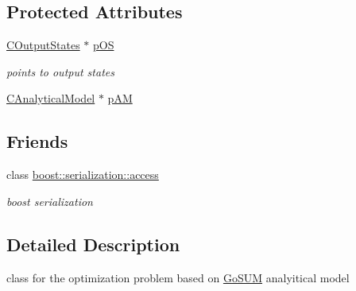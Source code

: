 \subsection*{Protected Attributes}
\begin{DoxyCompactItemize}
\item 
\hyperlink{class_go_s_u_m_1_1_c_output_states}{C\-Output\-States} $\ast$ \hyperlink{class_go_s_u_m_1_1_c_analytic_optimization_problem_abccbba115de9d825b2658de2a20a1197}{p\-O\-S}
\begin{DoxyCompactList}\small\item\em points to output states \end{DoxyCompactList}\item 
\hyperlink{class_go_s_u_m_1_1_c_analytical_model}{C\-Analytical\-Model} $\ast$ \hyperlink{class_go_s_u_m_1_1_c_analytic_optimization_problem_af428e86dcb3e73b0ac076e269a9e0e0a}{p\-A\-M}
\end{DoxyCompactItemize}
\subsection*{Friends}
\begin{DoxyCompactItemize}
\item 
class \hyperlink{class_go_s_u_m_1_1_c_analytic_optimization_problem_ac98d07dd8f7b70e16ccb9a01abf56b9c}{boost\-::serialization\-::access}
\begin{DoxyCompactList}\small\item\em boost serialization \end{DoxyCompactList}\end{DoxyCompactItemize}


\subsection{Detailed Description}
class for the optimization problem based on \hyperlink{namespace_go_s_u_m}{Go\-S\-U\-M} analyitical model 

